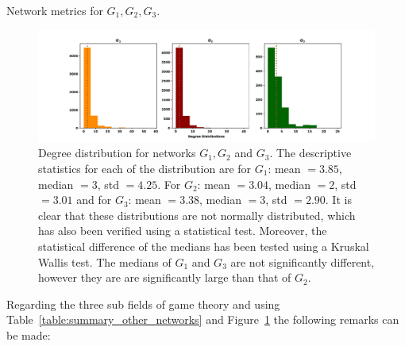 \documentclass{article}
\theoremstyle{definition}
\begin{document}
\begin{table}[!hbtp]
    \centering
    \resizebox{\textwidth}{!}{
    }
    \caption{Network metrics for \(G_1, G_2, G_3\).}\label{table:summary_other_networks}
\end{table}

\begin{figure}[!hbtp]
    \centering
    \includegraphics[width=\textwidth]{./assets/images/networks_ditributions.pdf}
    \caption{Degree distribution for networks \(G_1, G_2\) and \(G_3\). The descriptive
    statistics for each of the distribution are for \(G_1\): mean \(=3.85\),
    median \(=3\), std \(=4.25\). For \(G_2\): mean \(=3.04\), median \(=2\),
    std \(=3.01\) and for \(G_3\): mean \(=3.38\), median \(=3\), std \(=2.90\).
    It is clear that these distributions are not normally distributed, which has
    also been verified using a statistical test. Moreover, the statistical difference
    of the medians has been tested using a Kruskal Wallis test. The medians
    of \(G_1\) and \(G_3\) are not significantly different, however they are
    are significantly large than that of \(G_2\).}\label{fig:degree_distrs}
\end{figure}

Regarding the three sub fields of game theory and using Table~\ref{table:summary_other_networks}
and Figure~\ref{fig:degree_distrs} the following remarks can be made:
\end{document}
